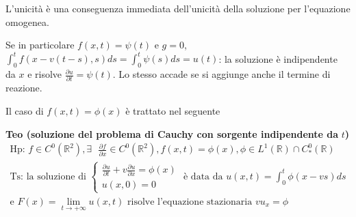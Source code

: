 \documentclass{article}
\begin{document}
L'unicit\`{a} \`{e} una conseguenza immediata dell'unicit\`{a} della
soluzione per l'equazione omogenea.

Se in particolare $f\left( x,t\right) =\psi \left( t\right) $ e $g=0$, $%
\int_{0}^{t}f\left( x-v\left( t-s\right) ,s\right) ds=\int_{0}^{t}\psi
\left( s\right) ds=u\left( t\right) $: la soluzione \`{e} indipendente da $x$
e risolve $\frac{\partial u}{\partial t}=\psi \left( t\right) $. Lo stesso
accade se si aggiunge anche il termine di reazione.

Il caso di $f\left( x,t\right) =\phi \left( x\right) $ \`{e} trattato nel
seguente

\textbf{Teo (soluzione del problema di Cauchy con sorgente indipendente da }$%
t$\textbf{)}%
\begin{gather*}
\text{Hp: }f\in C^{0}\left( 
\mathbb{R}
^{2}\right) ,\exists \text{ }\frac{\partial f}{\partial x}\in C^{0}\left( 
\mathbb{R}
^{2}\right) ,f\left( x,t\right) =\phi \left( x\right) ,\phi \in L^{1}\left( 
\mathbb{R}
\right) \cap C_{\ast }^{0}\left( 
\mathbb{R}
\right) \\
\text{Ts: la soluzione di }\left\{ 
\begin{array}{c}
\frac{\partial u}{\partial t}+v\frac{\partial u}{\partial x}=\phi \left(
x\right) \\ 
u\left( x,0\right) =0%
\end{array}%
\right. \text{ \`{e} data da }u\left( x,t\right) =\int_{0}^{t}\phi \left(
x-vs\right) ds \\
\text{e }F\left( x\right) =\lim_{t\rightarrow +\infty }u\left( x,t\right) 
\text{ risolve l'equazione stazionaria }vu_{x}=\phi
\end{gather*}
\end{document}
